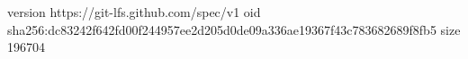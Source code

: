 version https://git-lfs.github.com/spec/v1
oid sha256:dc83242f642fd00f244957ee2d205d0de09a336ae19367f43c783682689f8fb5
size 196704
